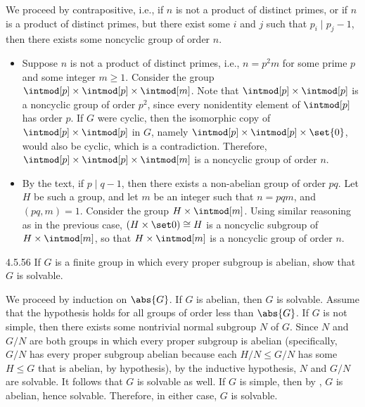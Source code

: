 \begin{sol}
	We proceed by contrapositive, i.e., if $n$ is not a product of distinct primes, or if $n$ is a product of distinct primes, but there exist some $i$ and $j$ such that $p_i \mid p_j - 1$, then there exists some noncyclic group of order $n$.
	\begin{itemize}
		\item Suppose $n$ is not a product of distinct primes, i.e., $n = p^2m$ for some prime $p$ and some integer $m \geq 1$.
	Consider the group $\intmod[p] \times \intmod[p] \times \intmod[m]$.
	Note that $\intmod[p] \times \intmod[p]$ is a noncyclic group of order $p^2$, since every nonidentity element of $\intmod[p]$ has order $p$.
	If $G$ were cyclic, then the isomorphic copy of $\intmod[p] \times \intmod[p]$ in $G$, namely $\intmod[p] \times \intmod[p] \times \set{0}$, would also be cyclic, which is a contradiction.
	Therefore, $\intmod[p] \times \intmod[p] \times \intmod[m]$ is a noncyclic group of order $n$.
		\item By the text, if $p \mid q - 1$, then there exists a non-abelian group of order $pq$.
	Let $H$ be such a group, and let $m$ be an integer such that $n = pqm$, and $(pq, m) = 1$.
	Consider the group $H \times \intmod[m]$.
	Using similar reasoning as in the previous case, $(H \times \set 0) \cong H$ is a noncyclic subgroup of $H \times \intmod[m]$, so that $H \times \intmod[m]$ is a noncyclic group of order $n$. \qedhere
	\end{itemize}
\end{sol}

\begin{exercise}{4.5.56}
	If $G$ is a finite group in which every proper subgroup is abelian, show that $G$ is solvable.
\end{exercise}

\begin{sol}
	We proceed by induction on $\abs{G}$.
	If $G$ is abelian, then $G$ is solvable.
	Assume that the hypothesis holds for all groups of order less than $\abs{G}$.
	If $G$ is not simple, then there exists some nontrivial normal subgroup $N$ of $G$.
	Since $N$ and $G/N$ are both groups in which every proper subgroup is abelian (specifically, $G/N$ has every proper subgroup abelian because each $H/N \leq G/N$ has some $H \leq G$ that is abelian, by hypothesis), by the inductive hypothesis, $N$ and $G/N$ are solvable.
	It follows that $G$ is solvable as well.
	If $G$ is simple, then by , $G$ is abelian, hence solvable.
	Therefore, in either case, $G$ is solvable.
\end{sol}